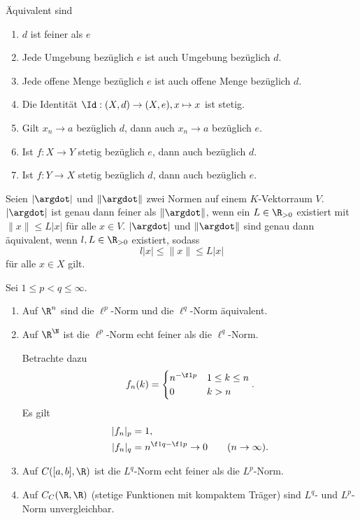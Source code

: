 \begin{prop}
	Äquivalent sind
	\begin{enumerate}[(1)]
		\item
			$d$ ist feiner als $e$
		\item
			Jede Umgebung bezüglich $e$ ist auch Umgebung bezüglich $d$.
		\item
			Jede offene Menge bezüglich $e$ ist auch offene Menge bezüglich $d$.
		\item
			Die Identität $\Id: (X,d) \to (X,e), x \mapsto x$ ist stetig.
		\item
			Gilt $x_n \to a$ bezüglich $d$, dann auch $x_n \to a$ bezüglich $e$.
		\item
			Ist $f: X \to Y$ stetig bezüglich $e$, dann auch bezüglich $d$.
		\item
			Ist $f: Y \to X$ stetig bezüglich $d$, dann auch bezüglich $e$.
	\end{enumerate}
	Seien $|\argdot|$ und $\|\argdot\|$ zwei Normen auf einem $K$-Vektorraum $V$.
	$|\argdot|$ ist genau dann feiner als $\|\argdot\|$, wenn ein $L \in \R_{>0}$ existiert mit $\|x\| \le L |x|$ für alle $x \in V$.
	$|\argdot|$ und $\|\argdot\|$ sind genau dann äquivalent, wenn $l,L \in \R_{>0}$ existiert, sodass
	\[
		l|x| \le \|x\| \le L|x|
	\]
	für alle $x \in X$ gilt.
\end{prop}

\begin{ex}
	Sei $1 \le p < q \le \infty$.
	\begin{enumerate}[(1)]
		\item
			Auf $\R^n$ sind die $\ell^p$-Norm und die $\ell^q$-Norm äquivalent.
		\item
			Auf $\R^\N$ ist die $\ell^p$-Norm echt feiner als die $\ell^q$-Norm.

			Betrachte dazu
			\[
				f_n(k) = \begin{cases}
					n^{-\f 1p} & 1 \le k \le n \\
					0 & k > n
				\end{cases}.
			\]
			Es gilt
			\begin{align*}
				|f_n|_p &= 1, \\
				|f_n|_q &= n^{\f 1q-\f 1p} \to 0 \qquad (n\to \infty).
			\end{align*}
		\item
			Auf $C([a,b], \R)$ ist die $L^q$-Norm echt feiner als die $L^p$-Norm.
		\item
			Auf $C_C(\R,\R)$ (stetige Funktionen mit kompaktem Träger) sind $L^q$- und $L^p$-Norm unvergleichbar.
	\end{enumerate}
\end{ex}

